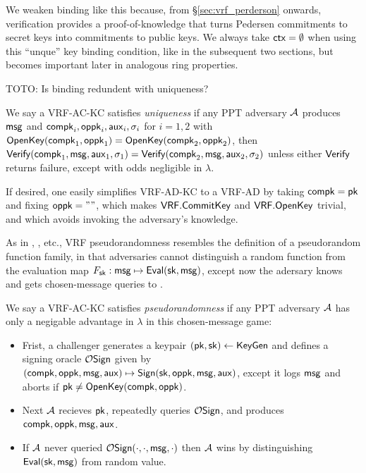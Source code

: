 We weaken binding like this because, from \S\ref{sec:vrf_perderson}
onwards, verification provides a proof-of-knowledge that turns
Pedersen commitments to secret keys into commitments to public keys.
We always take $\mathsf{ctx} = \emptyset$ when using this ``unque'' key binding
condition, like in the subsequent two sections, but
 \ctx becomes important later in analogous ring properties.

TOTO: Is binding redundent with uniqueness?

\begin{definition}
We say a VRF-AC-KC satisfies {\em uniqueness} if any PPT adversary $\mathcal{A}$
produces $\mathsf{msg}$ and $\mathsf{compk}_i,\mathsf{oppk}_i,\mathsf{aux}_i,\sigma_i$ for $i=1,2$
 with ${\mathsf{OpenKey}}(\mathsf{compk}_1,\mathsf{oppk}_1) = {\mathsf{OpenKey}}(\mathsf{compk}_2,\mathsf{oppk}_2)$, then
${\mathsf{Verify}}(\mathsf{compk}_1,\mathsf{msg},\mathsf{aux}_1,\sigma_1) = {\mathsf{Verify}}(\mathsf{compk}_2,\mathsf{msg},\mathsf{aux}_2,\sigma_2)$
unless either ${\mathsf{Verify}}$ returns failure,
except with odds negligible in $\lambda$.
\end{definition}

If desired, one easily simplifies VRF-AD-KC to a VRF-AD by
 taking $\mathsf{compk} = \mathsf{pk}$ and fixing $\mathsf{oppk} = \mathtt{""}$,
 which makes ${\mathsf{VRF}}.{\mathsf{CommitKey}}$ and ${\mathsf{VRF}}.{\mathsf{OpenKey}}$ trivial,
 and which avoids invoking the adversary's knowledge.

As in \cite{vrf_micali}, \cite{agg_dkg}, etc., VRF pseudorandomness
resembles the definition of a pseudorandom function family, in that
adversaries cannot distinguish a random function from the evaluation
map $F_\mathsf{sk} : \mathsf{msg} \mapsto {\ensuremath{\mathsf{Eval}}}(\mathsf{sk},\mathsf{msg})$,
except now the adersary knows \pk and gets chosen-message queries to \Sign.

\begin{definition}
We say a VRF-AC-KC satisfies {\em pseudorandomness} if 
any PPT adversary $\mathcal{A}$ has only a negigable advantage in $\lambda$
in this chosen-message game:
\begin{itemize}
 \item Frist, a challenger
  generates a keypair $(\mathsf{pk},\mathsf{sk}) \leftarrow {\ensuremath{\mathsf{KeyGen}}}$ and
  defines a signing oracle $\mathcal{O}\mathsf{Sign}$ given by
  $(\mathsf{compk},\mathsf{oppk},\mathsf{msg},\mathsf{aux}) \mapsto {\ensuremath{\mathsf{Sign}}}(\mathsf{sk},\mathsf{oppk},\mathsf{msg},\mathsf{aux})$,
   except it logs $\mathsf{msg}$ and aborts if $\mathsf{pk} \ne {\ensuremath{\mathsf{OpenKey}}}(\mathsf{compk},\mathsf{oppk})$.
 \item Next $\mathcal{A}$ recieves $\mathsf{pk}$, repeatedly queries $\mathcal{O}\mathsf{Sign}$,
  and produces $\mathsf{compk},\mathsf{oppk},\mathsf{msg},\mathsf{aux}$. 
 \item If $\mathcal{A}$ never queried $\mathcal{O}\mathsf{Sign}(\cdot,\cdot,\mathsf{msg},\cdot)$ then
  $\mathcal{A}$ wins by distinguishing ${\mathsf{Eval}}(\mathsf{sk},\mathsf{msg})$ from random value.
\end{itemize}
\end{definition}

